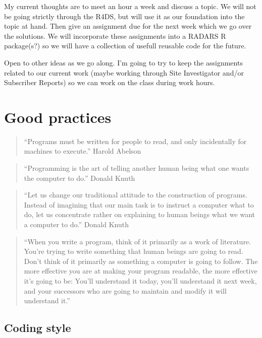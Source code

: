 \documentclass[]{book}
\theoremstyle{definition}
\theoremstyle{definition}
\theoremstyle{definition}
\theoremstyle{remark}
\begin{document}
My current thoughts are to meet an hour a week and discuss a topic. We
will not be going strictly through the R4DS, but will use it as our
foundation into the topic at hand. Then give an assignment due for the
next week which we go over the solutions. We will incorporate these
assignments into a RADARS R package(s?) so we will have a collection of
usefull reusable code for the future.

Open to other ideas as we go along. I'm going to try to keep the
assignments related to our current work (maybe working through Site
Investigator and/or Subscriber Reports) so we can work on the class
during work hours.

\chapter{Good practices}\label{good-practices}

\begin{quote}
``Programs must be written for people to read, and only incidentally for
machines to execute.'' Harold Abelson
\end{quote}

\begin{quote}
``Programming is the art of telling another human being what one wants
the computer to do.'' Donald Knuth
\end{quote}

\begin{quote}
``Let us change our traditional attitude to the construction of
programs. Instead of imagining that our main task is to instruct a
computer what to do, let us concentrate rather on explaining to human
beings what we want a computer to do.'' Donald Knuth
\end{quote}

\begin{quote}
``When you write a program, think of it primarily as a work of
literature. You're trying to write something that human beings are going
to read. Don't think of it primarily as something a computer is going to
follow. The more effective you are at making your program readable, the
more effective it's going to be: You'll understand it today, you'll
understand it next week, and your successors who are going to maintain
and modify it will understand it.''
\end{quote}

\section{Coding style}\label{coding-style}
\end{document}
